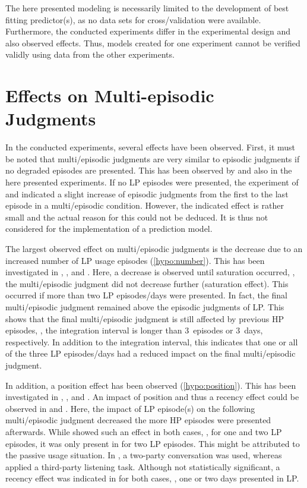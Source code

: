 The here presented modeling is necessarily limited to the development of best fitting predictor(s), as no data sets for cross\-/validation were available.
Furthermore, the conducted experiments differ in the experimental design and also observed effects.
Thus, models created for one experiment cannot be verified validly using data from the other experiments.

\section{Effects on Multi-episodic Judgments}
In the conducted experiments, several effects have been observed.
First, it must be noted that multi\-/episodic judgments are very similar to episodic judgments if no degraded episodes are presented.
This has been observed by \citet{moller_single-call_2011} and also in the here presented experiments.
If no \ac{LP} episodes were presented, the experiment of \citet{moller_single-call_2011} and  indicated a slight increase of episodic judgments from the first to the last episode in a multi\-/episodic condition.
However, the indicated effect is rather small and the actual reason for this could not be deduced.
It is thus not considered for the implementation of a prediction model.

The largest observed effect on multi\-/episodic judgments is the decrease due to an increased number of \ac{LP} usage episodes (\autoref{hypo:number}).
This has been investigated in , \EIIa{}, and .
Here, a decrease is observed until saturation occurred, \ie, the multi\-/episodic judgment did not decrease further (saturation effect).
This occurred if more than two \ac{LP} episodes/days were presented.
In fact, the final multi\-/episodic judgment remained above the episodic judgments of \ac{LP}.
This shows that the final multi\-/episodic judgment is still affected by previous \ac{HP} episodes, \ie, the integration interval is longer than 3~episodes or 3~days, respectively.
In addition to the integration interval, this indicates that one or all of the three \ac{LP} episodes/days had a reduced impact on the final multi\-/episodic judgment.

In addition, a position effect has been observed (\autoref{hypo:position}).
This has been investigated in , \EIIa{}, and .
An impact of position and thus a recency effect could be observed in  and \EIIa{}.
Here, the impact of \ac{LP} episode(s) on the following multi\-/episodic judgment decreased the more \ac{HP} episodes were presented afterwards.
While  showed such an effect in both cases, \ie, for one and two \ac{LP} episodes, it was only present in \EIIa{} for two \ac{LP} episodes.
This might be attributed to the passive usage situation.
In , a two-party conversation was used, whereas \EIIa{} applied a third-party listening task.
Although not statistically significant, a recency effect was indicated in  for both cases, \ie, one or two days presented in \ac{LP}.

